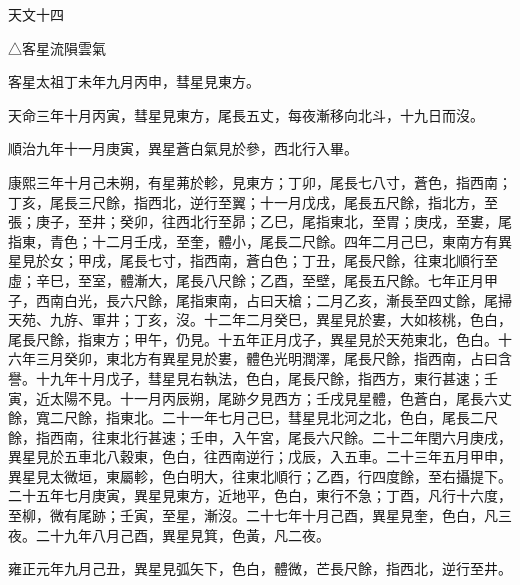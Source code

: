 
\begin{pinyinscope}
天文十四

△客星流隕雲氣

客星太祖丁未年九月丙申，彗星見東方。

天命三年十月丙寅，彗星見東方，尾長五丈，每夜漸移向北斗，十九日而沒。

順治九年十一月庚寅，異星蒼白氣見於參，西北行入畢。

康熙三年十月己未朔，有星茀於軫，見東方；丁卯，尾長七八寸，蒼色，指西南；丁亥，尾長三尺餘，指西北，逆行至翼；十一月戊戌，尾長五尺餘，指北方，至張；庚子，至井；癸卯，往西北行至昴；乙巳，尾指東北，至胃；庚戌，至婁，尾指東，青色；十二月壬戌，至奎，體小，尾長二尺餘。四年二月己巳，東南方有異星見於女；甲戌，尾長七寸，指西南，蒼白色；丁丑，尾長尺餘，往東北順行至虛；辛巳，至室，體漸大，尾長八尺餘；乙酉，至壁，尾長五尺餘。七年正月甲子，西南白光，長六尺餘，尾指東南，占曰天槍；二月乙亥，漸長至四丈餘，尾掃天苑、九斿、軍井；丁亥，沒。十二年二月癸巳，異星見於婁，大如核桃，色白，尾長尺餘，指東方；甲午，仍見。十五年正月戊子，異星見於天苑東北，色白。十六年三月癸卯，東北方有異星見於婁，體色光明潤澤，尾長尺餘，指西南，占曰含譽。十九年十月戊子，彗星見右執法，色白，尾長尺餘，指西方，東行甚速；壬寅，近太陽不見。十一月丙辰朔，尾跡夕見西方；壬戌見星體，色蒼白，尾長六丈餘，寬二尺餘，指東北。二十一年七月己巳，彗星見北河之北，色白，尾長二尺餘，指西南，往東北行甚速；壬申，入午宮，尾長六尺餘。二十二年閏六月庚戌，異星見於五車北八穀東，色白，往西南逆行；戊辰，入五車。二十三年五月甲申，異星見太微垣，東屬軫，色白明大，往東北順行；乙酉，行四度餘，至右攝提下。二十五年七月庚寅，異星見東方，近地平，色白，東行不急；丁酉，凡行十六度，至柳，微有尾跡；壬寅，至星，漸沒。二十七年十月己酉，異星見奎，色白，凡三夜。二十九年八月己酉，異星見箕，色黃，凡二夜。

雍正元年九月己丑，異星見弧矢下，色白，體微，芒長尺餘，指西北，逆行至井。


\end{pinyinscope}
